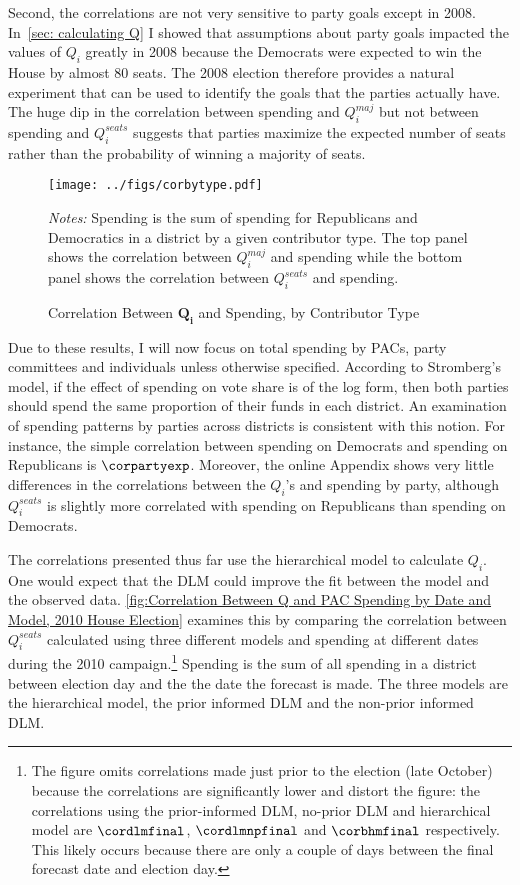 \documentclass[12pt,final,fleqn]{article}
\theoremstyle{plain}
\begin{document}
Second, the correlations are not very sensitive to party goals except in 2008. In~\autoref{sec: calculating Q} I showed that assumptions about party goals impacted the values of $Q_i$ greatly in 2008 because the Democrats were expected to win the House by almost 80 seats. The 2008 election therefore provides a natural experiment that can be used to identify the goals that the parties actually have. The huge dip in the correlation between spending and $Q_i^{maj}$ but not between spending and $Q_i^{seats}$ suggests that parties maximize the expected number of seats rather than the probability of winning a majority of seats. 

\begin{figure}[!htb]
\texttt{[image: ../figs/corbytype.pdf]}
\vspace{.5cm}
\caption{Correlation Between $\mathbf{Q_i}$ and Spending, by Contributor Type}
\label{fig:Correlation Between Q and Spending, by Contributor Type}
\begin{minipage}{\linewidth}
\footnotesize
\emph{Notes:} Spending is the sum of spending for Republicans and Democratics in a district by a given contributor type. The top panel shows the correlation between $Q_i^{maj}$ and spending while the bottom panel shows the correlation between $Q_i^{seats}$ and spending.
\end{minipage}
\end{figure}

Due to these results, I will now focus on total spending by PACs, party committees and individuals unless otherwise specified. According to Stromberg's model, if the effect of spending on vote share is of the log form, then both parties should spend the same proportion of their funds in each district. An examination of spending patterns by parties across districts is consistent with this notion. For instance, the simple correlation between spending on Democrats and spending on Republicans is $\corpartyexp$. Moreover, the online Appendix shows very little differences in the correlations between the $Q_i$'s and spending by party, although $Q_i^{seats}$ is slightly more correlated with spending on Republicans than spending on Democrats.


The correlations presented thus far use the hierarchical model to calculate $Q_i$. One would expect that the DLM could improve the fit between the model and the observed data. \autoref{fig:Correlation Between Q and PAC Spending by Date and Model, 2010 House Election} examines this by comparing the correlation between $Q_i^{seats}$ calculated using three different models and spending at different dates during the 2010 campaign.\footnote{The figure omits correlations made just prior to the election (late October) because the correlations are significantly lower and distort the figure: the correlations using the prior-informed DLM, no-prior DLM and hierarchical model are $\cordlmfinal$, $\cordlmnpfinal$ and $\corbhmfinal$ respectively. This likely occurs because there are only a couple of days between the final forecast date and election day.} Spending is the sum of all spending in a district between election day and the the date the forecast is made. The three models are the hierarchical model, the prior informed DLM and the non-prior informed DLM. 
\end{document}

